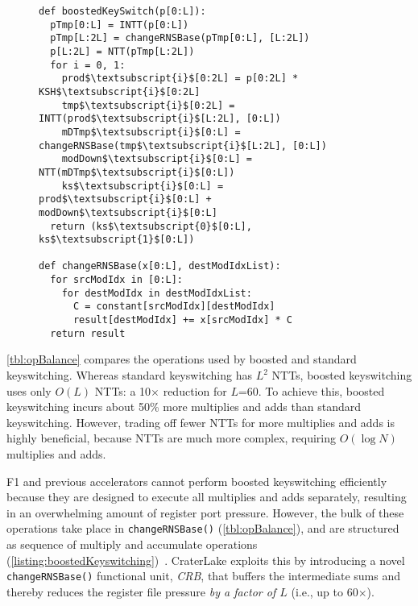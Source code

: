     \begin{figure}\label{lst:boostedKeyswitching}
      \begin{center}
          \begin{lstlisting}[caption={Boosted keyswitching implementation.}, mathescape=true, style=custompython, label=listing:boostedKeyswitching]
def boostedKeySwitch(p[0:L]):
  pTmp[0:L] = INTT(p[0:L])
  pTmp[L:2L] = changeRNSBase(pTmp[0:L], [L:2L])
  p[L:2L] = NTT(pTmp[L:2L])
  for i = 0, 1:
    prod$\textsubscript{i}$[0:2L] = p[0:2L] * KSH$\textsubscript{i}$[0:2L]
    tmp$\textsubscript{i}$[0:2L] = INTT(prod$\textsubscript{i}$[L:2L], [0:L])
    mDTmp$\textsubscript{i}$[0:L] = changeRNSBase(tmp$\textsubscript{i}$[L:2L], [0:L])
    modDown$\textsubscript{i}$[0:L] = NTT(mDTmp$\textsubscript{i}$[0:L])
    ks$\textsubscript{i}$[0:L] = prod$\textsubscript{i}$[0:L] + modDown$\textsubscript{i}$[0:L]
  return (ks$\textsubscript{0}$[0:L], ks$\textsubscript{1}$[0:L])

def changeRNSBase(x[0:L], destModIdxList):
  for srcModIdx in [0:L]:
    for destModIdx in destModIdxList:
      C = constant[srcModIdx][destModIdx]
      result[destModIdx] += x[srcModIdx] * C
  return result
          \end{lstlisting}
        \end{center}
      \end{figure}

\tblOpBalance

\autoref{tbl:opBalance} compares the operations used by boosted and standard
keyswitching. Whereas standard keyswitching has $L^2$ NTTs, boosted
keyswitching uses only $O(L)$ NTTs: a 10$\times$ reduction for $L$=60. To
achieve this, boosted keyswitching incurs about 50\% more multiplies and adds
than standard keyswitching. However, trading off fewer NTTs for more multiplies
and adds is highly beneficial, because NTTs are much more complex, requiring
$O(\log N)$ multiplies and adds.

F1 and previous accelerators cannot perform boosted keyswitching efficiently
because they are designed to execute all multiplies and adds separately,
resulting in an overwhelming amount of register port pressure. However, the
bulk of these operations take place in \verb!changeRNSBase()!
(\autoref{tbl:opBalance}), and are structured as sequence of multiply and
accumulate operations
(\autoref{listing:boostedKeyswitching})~\cite{bajard:2016:full}. CraterLake
exploits this by introducing a novel \verb!changeRNSBase()! functional unit,
\emph{CRB}, that buffers the intermediate sums and thereby reduces the register
file pressure \emph{by a factor of $L$} (i.e., up to 60$\times$).

